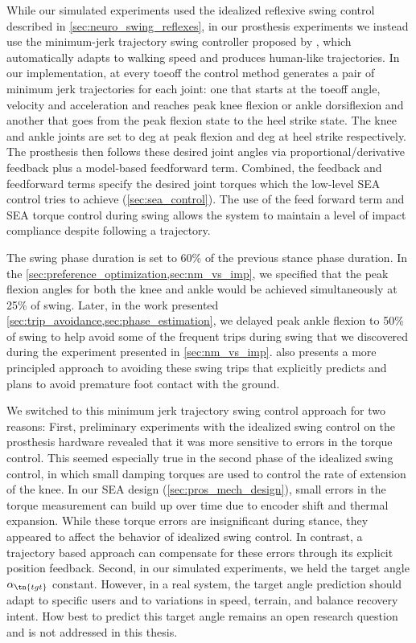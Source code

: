 While our simulated experiments used the idealized reflexive swing control
described in \cref{sec:neuro_swing_reflexes}, in our prosthesis experiments we
instead use the minimum-jerk trajectory swing controller proposed by
\citet{lenzi2014speed}, which automatically adapts to walking speed and produces
human-like trajectories. In our implementation, at every toeoff the control method
generates a pair of minimum jerk trajectories for each joint: one that starts at
the toeoff angle, velocity and acceleration and reaches peak knee flexion or
ankle dorsiflexion and another that goes from the peak flexion state to the heel
strike state. The knee and ankle joints are set to \unit[65 and 2]{deg} at peak
flexion and \unit[2 and -5]{deg} at heel strike respectively. The prosthesis
then follows these desired joint angles via proportional/derivative feedback
plus a model-based feedforward term. Combined, the feedback and feedforward
terms specify the desired joint torques which the low-level SEA control tries to
achieve (\cref{sec:sea_control}). The use of the feed forward term and SEA
torque control during swing allows the system to maintain a level of impact
compliance despite following a trajectory.

The swing phase duration is set to 60\% of the previous stance phase duration.
In the \cref{sec:preference_optimization,sec:nm_vs_imp}, we specified that the
peak flexion angles for both the knee and ankle would be achieved simultaneously
at 25\% of swing. Later, in the work presented
\cref{sec:trip_avoidance,sec:phase_estimation}, we delayed peak ankle flexion to
50\% of swing to help avoid some of the frequent trips during swing that we
discovered during the experiment presented in \cref{sec:nm_vs_imp}.
 also presents a more principled approach to avoiding
these swing trips that explicitly predicts and plans to avoid premature foot
contact with the ground.

We switched to this minimum jerk trajectory swing control approach for two
reasons: First, preliminary experiments with the idealized swing control on the
prosthesis hardware revealed that it was more sensitive to errors in the torque
control. This seemed especially true in the second phase of the idealized swing
control, in which small damping torques are used to control the rate of
extension of the knee. In our SEA design (\cref{sec:pros_mech_design}), small
errors in the torque measurement can build up over time due to encoder shift and
thermal expansion.  While these torque errors are insignificant during stance,
they appeared to affect the behavior of idealized swing control. In contrast, a
trajectory based approach can compensate for these errors through its explicit
position feedback. Second, in our simulated experiments, we held the target
angle $\alpha_\tn{tgt}$ constant. However, in a real system, the target angle
prediction should adapt to specific users and to variations in speed, terrain,
and balance recovery intent. How best to predict this target angle remains an
open research question and is not addressed in this thesis.

